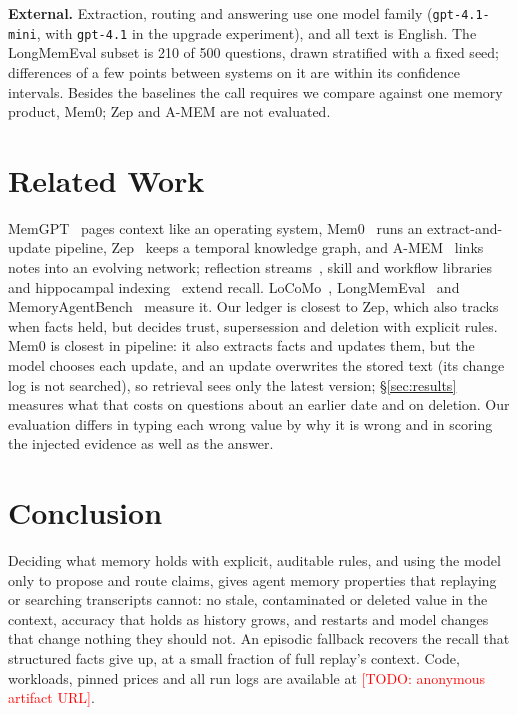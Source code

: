 \documentclass[10pt,conference]{IEEEtran}
\newcommand{\todo}[1]{\textcolor{red}{[TODO: #1]}}
\begin{document}
\textbf{External.} Extraction, routing and answering use one model family
(\texttt{gpt-4.1-mini}, with \texttt{gpt-4.1} in the upgrade experiment), and
all text is English. The LongMemEval subset is 210 of 500 questions, drawn
stratified with a fixed seed; differences of a few points between systems on
it are within its confidence intervals. Besides the baselines the call
requires we compare against one memory product, Mem0; Zep and A-MEM are not
evaluated.

\section{Related Work}

MemGPT~\cite{packer2023memgpt} pages context like an operating system,
Mem0~\cite{chhikara2025mem0} runs an extract-and-update pipeline,
Zep~\cite{rasmussen2025zep} keeps a temporal knowledge graph, and
A-MEM~\cite{xu2025amem} links notes into an evolving network; reflection
streams~\cite{park2023generative}, skill and workflow
libraries~\cite{wang2023voyager,wang2024awm} and hippocampal
indexing~\cite{gutierrez2024hipporag} extend recall. LoCoMo~\cite{maharana2024locomo},
LongMemEval~\cite{wu2025longmemeval} and MemoryAgentBench~\cite{hu2025memoryagentbench}
measure it. Our ledger is closest to Zep, which also tracks when facts held, but
decides trust, supersession and deletion with explicit rules. Mem0 is closest
in pipeline: it also extracts facts and updates them, but the model chooses
each update, and an update overwrites the stored text (its change log is not
searched), so retrieval sees only the latest version;
\S\ref{sec:results} measures what that costs on questions about an earlier
date and on deletion. Our evaluation differs in typing each wrong value by why it is wrong and in
scoring the injected evidence as well as the answer.

\section{Conclusion}

Deciding what memory holds with explicit, auditable rules, and using the
model only to propose and route claims, gives agent memory properties that
replaying or searching transcripts cannot: no stale, contaminated or deleted
value in the context, accuracy that holds as history grows, and restarts and
model changes that change nothing they should not. An episodic fallback
recovers the recall that structured facts give up, at a small fraction of full
replay's context. Code, workloads, pinned prices and all run logs are
available at \todo{anonymous artifact URL}.



\end{document}
